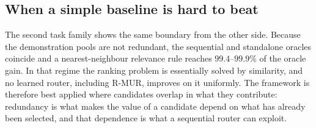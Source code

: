\subsection{When a simple baseline is hard to beat}

The second task family shows the same boundary from the other side. Because
the demonstration pools are not redundant, the sequential and standalone
oracles coincide and a nearest-neighbour relevance rule reaches
$99.4$--$99.9\%$ of the oracle gain. In that regime the ranking problem is
essentially solved by similarity, and no learned router, including R-MUR,
improves on it uniformly. The framework is therefore best applied where
candidates overlap in what they contribute: redundancy is what makes the value
of a candidate depend on what has already been selected, and that dependence is
what a sequential router can exploit.
